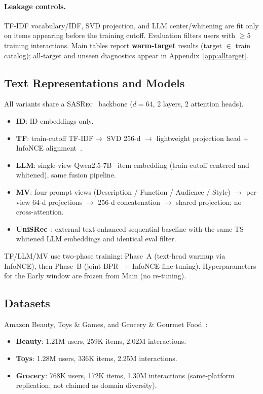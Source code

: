 \documentclass[sigconf,natbib=true,anonymous]{acmart}
\newcommand{\tfidf}{\textsc{TF-IDF}\xspace}
\newcommand{\base}{\textsc{SASRec}\xspace}
\begin{document}
\paragraph{Leakage controls.}
\tfidf vocabulary/IDF, SVD projection, and LLM center/whitening are fit only on items appearing before the training cutoff.
Evaluation filters users with $\ge 5$ training interactions.
Main tables report \textbf{warm-target} results (target $\in$ train catalog); all-target and unseen diagnostics appear in Appendix~\ref{app:alltarget}.

\subsection{Text Representations and Models}
\label{sec:models}

All variants share a \base~\cite{kang2018sasrec} backbone ($d{=}64$, 2 layers, 2 attention heads).

\begin{itemize}[leftmargin=*,itemsep=1pt]
\item \textbf{ID}: ID embeddings only.
\item \textbf{TF}: train-cutoff \tfidf $\to$ SVD 256-d $\to$ lightweight projection head + InfoNCE alignment~\cite{oord2018cpc}.
\item \textbf{LLM}: single-view Qwen2.5-7B~\cite{qwen2024qwen25} item embedding (train-cutoff centered and whitened), same fusion pipeline.
\item \textbf{MV}: four prompt views (Description / Function / Audience / Style) $\to$ per-view 64-d projections $\to$ 256-d concatenation $\to$ shared projection; no cross-attention.
\item \textbf{UniSRec}~\cite{hou2022unisrec}: external text-enhanced sequential baseline with the same TS-whitened LLM embeddings and identical eval filter.
\end{itemize}

TF/LLM/MV use two-phase training: Phase~A (text-head warmup via InfoNCE), then Phase~B (joint BPR~\cite{rendle2009bpr} + InfoNCE fine-tuning).
Hyperparameters for the Early window are frozen from Main (no re-tuning).

\subsection{Datasets}

Amazon Beauty, Toys \& Games, and Grocery \& Gourmet Food~\cite{mcauley2015amazon,ni2019amazon}:
\begin{itemize}[leftmargin=*,itemsep=1pt]
\item \textbf{Beauty}: 1.21M users, 259K items, 2.02M interactions.
\item \textbf{Toys}: 1.28M users, 336K items, 2.25M interactions.
\item \textbf{Grocery}: 768K users, 172K items, 1.30M interactions (same-platform replication; not claimed as domain diversity).
\end{itemize}
\end{document}
